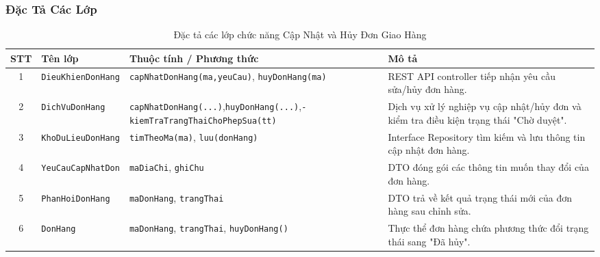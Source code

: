 \subsubsection{Đặc Tả Các Lớp}
\begin{table}[H]
  \centering
  \small
  \begin{tabularx}{\textwidth}{|c|>{\raggedright\arraybackslash}p{3.5cm}|>{\raggedright\arraybackslash}p{4.5cm}|>{\raggedright\arraybackslash}X|}
    \hline
    \textbf{STT} & \textbf{Tên lớp} & \textbf{Thuộc tính / Phương thức} & \textbf{Mô tả} \\
    \hline
    1 & \texttt{Dieu\allowbreak Khien\allowbreak Don\allowbreak Hang} & \texttt{cap\allowbreak Nhat\allowbreak Don\allowbreak Hang\allowbreak (ma,\allowbreak yeu\allowbreak Cau)}, \texttt{huy\allowbreak Don\allowbreak Hang\allowbreak (ma)} & REST API controller tiếp nhận yêu cầu sửa/hủy đơn hàng. \\ \hline
    2 & \texttt{Dich\allowbreak Vu\allowbreak Don\allowbreak Hang} & \texttt{cap\allowbreak Nhat\allowbreak Don\allowbreak Hang\allowbreak (...)},\newline \texttt{huy\allowbreak Don\allowbreak Hang\allowbreak (...)},\newline \texttt{- kiem\allowbreak Tra\allowbreak Trang\allowbreak Thai\allowbreak Cho\allowbreak Phep\allowbreak Sua\allowbreak (tt)} & Dịch vụ xử lý nghiệp vụ cập nhật/hủy đơn và kiểm tra điều kiện trạng thái "Chờ duyệt". \\ \hline
    3 & \texttt{Kho\allowbreak Du\allowbreak Lieu\allowbreak Don\allowbreak Hang} & \texttt{tim\allowbreak Theo\allowbreak Ma\allowbreak (ma)}, \texttt{luu\allowbreak (don\allowbreak Hang)} & Interface Repository tìm kiếm và lưu thông tin cập nhật đơn hàng. \\ \hline
    4 & \texttt{Yeu\allowbreak Cau\allowbreak Cap\allowbreak Nhat\allowbreak Don} & \texttt{ma\allowbreak Dia\allowbreak Chi}, \texttt{ghi\allowbreak Chu} & DTO đóng gói các thông tin muốn thay đổi của đơn hàng. \\ \hline
    5 & \texttt{Phan\allowbreak Hoi\allowbreak Don\allowbreak Hang} & \texttt{ma\allowbreak Don\allowbreak Hang}, \texttt{trang\allowbreak Thai} & DTO trả về kết quả trạng thái mới của đơn hàng sau chỉnh sửa. \\ \hline
    6 & \texttt{Don\allowbreak Hang} & \texttt{ma\allowbreak Don\allowbreak Hang}, \texttt{trang\allowbreak Thai}, \texttt{huy\allowbreak Don\allowbreak Hang\allowbreak ()} & Thực thể đơn hàng chứa phương thức đổi trạng thái sang "Đã hủy". \\
    \hline
  \end{tabularx}
  \caption{Đặc tả các lớp chức năng Cập Nhật và Hủy Đơn Giao Hàng}
  \label{tab:class-spec-uc03}
\end{table}

